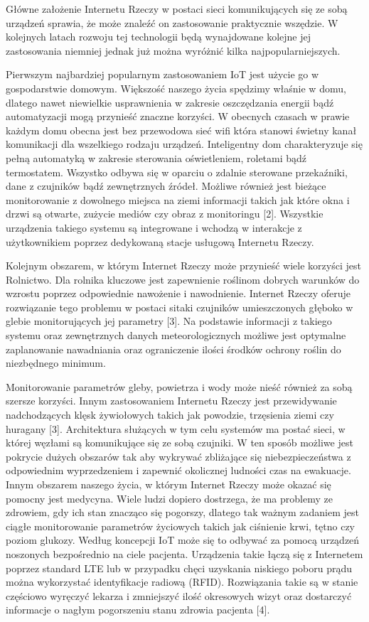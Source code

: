 \documentclass[12pt, twoside, openany]{mwrep}
\begin{document}
Główne założenie Internetu Rzeczy w postaci sieci komunikujących się ze sobą urządzeń sprawia, że może znaleźć on zastosowanie praktycznie wszędzie. W kolejnych latach rozwoju tej technologii będą wynajdowane kolejne jej zastosowania niemniej jednak już można wyróżnić kilka najpopularniejszych.
\par
Pierwszym najbardziej popularnym zastosowaniem IoT jest użycie go w gospodarstwie domowym.  Większość naszego życia spędzimy właśnie w domu, dlatego nawet niewielkie usprawnienia w zakresie oszczędzania energii bądź automatyzacji mogą przynieść znaczne korzyści. W obecnych czasach w prawie każdym domu obecna jest bez przewodowa sieć wifi która stanowi świetny kanał komunikacji dla wszelkiego rodzaju urządzeń. Inteligentny dom charakteryzuje się pełną automatyką w zakresie sterowania oświetleniem, roletami bądź termostatem. Wszystko odbywa się w oparciu o zdalnie sterowane przekaźniki, dane z czujników bądź zewnętrznych źródeł. Możliwe również jest bieżące monitorowanie z dowolnego miejsca na ziemi informacji takich jak które okna i drzwi są otwarte, zużycie mediów czy obraz z monitoringu [2]. Wszystkie urządzenia takiego systemu są integrowane i wchodzą w interakcje z użytkownikiem poprzez dedykowaną stacje usługową Internetu Rzeczy.
\par
Kolejnym obszarem, w którym Internet Rzeczy może przynieść wiele korzyści jest Rolnictwo. Dla rolnika kluczowe jest zapewnienie roślinom dobrych warunków do wzrostu poprzez odpowiednie nawożenie i nawodnienie. Internet Rzeczy oferuje rozwiązanie tego problemu w postaci sitaki czujników umieszczonych głęboko w glebie monitorujących jej parametry [3]. Na podstawie informacji z takiego systemu oraz zewnętrznych danych meteorologicznych możliwe jest optymalne zaplanowanie nawadniania oraz ograniczenie ilości środków ochrony roślin do niezbędnego minimum.
\par
Monitorowanie parametrów gleby, powietrza i wody może nieść również za sobą szersze korzyści. Innym zastosowaniem Internetu Rzeczy jest przewidywanie nadchodzących klęsk żywiołowych takich jak powodzie, trzęsienia ziemi czy huragany [3]. Architektura służących w tym celu systemów ma postać sieci, w której węzłami są komunikujące się ze sobą czujniki. W ten sposób możliwe jest pokrycie dużych obszarów tak aby wykrywać zbliżające się niebezpieczeństwa z odpowiednim wyprzedzeniem i zapewnić okolicznej ludności czas na ewakuacje.
Innym obszarem naszego życia, w którym Internet Rzeczy może okazać się pomocny jest medycyna. Wiele ludzi dopiero dostrzega, że ma problemy ze zdrowiem, gdy ich stan znacząco się pogorszy, dlatego tak ważnym zadaniem jest ciągłe monitorowanie parametrów życiowych takich jak ciśnienie krwi, tętno czy poziom glukozy. Według koncepcji IoT może się to odbywać za pomocą urządzeń noszonych bezpośrednio na ciele pacjenta. Urządzenia takie łączą się z Internetem poprzez standard LTE lub w przypadku chęci uzyskania niskiego poboru prądu można wykorzystać identyfikacje radiową (RFID). Rozwiązania takie są w stanie częściowo wyręczyć lekarza i zmniejszyć ilość okresowych wizyt oraz dostarczyć informacje o nagłym pogorszeniu stanu zdrowia pacjenta [4].
\end{document}

